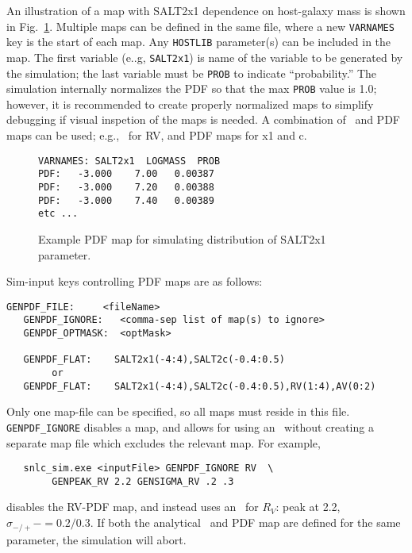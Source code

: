 \documentclass[12pt]{article}
\begin{document}
An illustration of a map with SALT2x1 dependence on host-galaxy mass
is shown in Fig.~\ref{fig:genpdf_file}. Multiple maps can be defined
in the same file, where a new {\tt VARNAMES} key is the start
of each map. Any {\tt HOSTLIB} parameter(s) can be included in the map.
The first variable (e..g, {\tt SALT2x1}) is name of the variable
to be generated by the simulation; the last variable must be {\tt PROB}
to indicate ``probability.'' The simulation internally normalizes the
PDF so that the max {\tt PROB} value is 1.0; however, it is recommended
to create properly normalized maps to simplify debugging if visual
inspetion of the maps is needed.
A combination of \AG\ and PDF maps can be used;
e.g., \AG\ for RV, and PDF maps for x1 and c. 

\begin{figure} [ht] 
\begin{center}
\begin{Verbatim}[frame=single]
VARNAMES: SALT2x1  LOGMASS  PROB 
PDF:   -3.000    7.00   0.00387 
PDF:   -3.000    7.20   0.00388
PDF:   -3.000    7.40   0.00389 
etc ...
\end{Verbatim}
\end{center}
\vspace{-0.8cm}
\caption{
  Example PDF map for simulating distribution of SALT2x1 parameter.
 }
\label{fig:genpdf_file}
\end{figure}

Sim-input keys controlling PDF maps are as follows:
\begin{Verbatim}[frame=single]
   GENPDF_FILE:     <fileName>
   GENPDF_IGNORE:   <comma-sep list of map(s) to ignore>
   GENPDF_OPTMASK:  <optMask>

   GENPDF_FLAT:    SALT2x1(-4:4),SALT2c(-0.4:0.5)
        or
   GENPDF_FLAT:    SALT2x1(-4:4),SALT2c(-0.4:0.5),RV(1:4),AV(0:2) 
\end{Verbatim}
%
Only one map-file can be specified, so all maps must reside in this file.
{\tt GENPDF\_IGNORE} disables a map, and allows for using an \AG\
without creating a separate map file which excludes
the relevant map. For example,
\begin{verbatim}
   snlc_sim.exe <inputFile> GENPDF_IGNORE RV  \
        GENPEAK_RV 2.2 GENSIGMA_RV .2 .3
\end{verbatim}
%
disables the RV-PDF map, and instead uses an \AG\ for 
$R_V$:  peak at 2.2, $\sigma_{-/+} -= 0.2/0.3$.
If both the analytical \AG\ and PDF map are defined for the same
parameter, the simulation will abort. 
\end{document}
